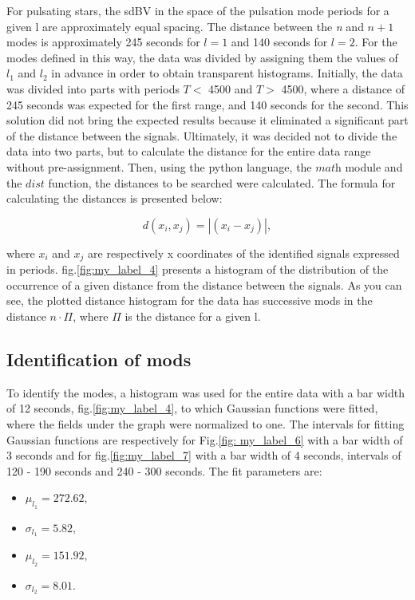 \documentclass{aa}
\begin{document}
For pulsating stars, the sdBV in the space of the pulsation mode periods for a given l are approximately equal spacing. The distance between the \textit{n} and \textit{$ n + 1 $} modes is approximately 245 seconds for $ l = 1 $ and 140 seconds for $ l = 2 $. For the modes defined in this way, the data was divided by assigning them the values of $ l_1 $ and $ l_2 $ in advance in order to obtain transparent histograms. Initially, the data was divided into parts with periods $ T <$ 4500 and $ T> $ 4500, where a distance of 245 seconds was expected for the first range, and 140 seconds for the second. This solution did not bring the expected results because it eliminated a significant part of the distance between the signals. Ultimately, it was decided not to divide the data into two parts, but to calculate the distance for the entire data range without pre-assignment. Then, using the python language, the $ \textit{math} $ module and the $ \textit{dist} $ function, the distances to be searched were calculated. The formula for calculating the distances is presented below:

\begin{equation}
    d(x_i, x_j) = |(x_i - x_j)|,
\end{equation}

where $ x_i $ and $ x_j $ are respectively x coordinates of the identified signals expressed in periods. fig.\ref{fig:my_label_4} presents a histogram of the distribution of the occurrence of a given distance from the distance between the signals. As you can see, the plotted distance histogram for the data has successive mods in the distance $ n \cdot \Pi $, where $ \Pi $ is the distance for a given l. 


\subsection{Identification of mods}

To identify the modes, a histogram was used for the entire data with a bar width of 12 seconds, fig.\ref{fig:my_label_4}, to which Gaussian functions were fitted, where the fields under the graph were normalized to one. The intervals for fitting Gaussian functions are respectively for Fig.\ref{fig: my_label_6} with a bar width of 3 seconds and for fig.\ref{fig:my_label_7} with a bar width of 4 seconds, intervals of 120 - 190 seconds and 240 - 300 seconds. The fit parameters are:

\begin{itemize}
    \item $\mu_{l_1} = 272.62,$
    \item $\sigma_{l_1} = 5.82,$
    \item $\mu_{l_2} = 151.92,$
    \item $\sigma_{l_2} = 8.01.$
\end{itemize}
\end{document}
